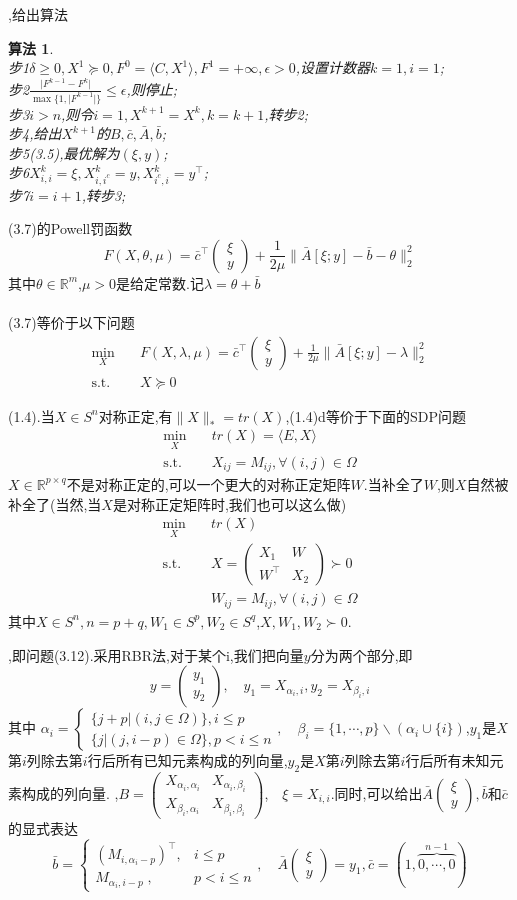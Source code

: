\documentclass[UTF8]{ctexart}
\newtheorem{algo}{算法}
\newcommand{\s}{\quad}
\newcommand{\p}{\paragraph{}\s}
\newcommand{\equSplit}[1]{\begin{equation}\begin{split}#1\end{split}\end{equation}}
\newcommand{\equ}[1]{\begin{equation}#1\end{equation}}
\newcommand{\Tst}{\text{s.t.}\s}
\newcommand{\abs}[1]{\lvert#1\rvert}
\newcommand{\norm}[1]{\lVert#1\rVert}
\newcommand{\inprod}[1]{\langle#1\rangle}
\newcommand{\Real}[1]{\mathbb{R}^{#1}}
\newcommand{\nunorm}{\norm{X}_*}
\newcommand{\pMa}[1]{\begin{pmatrix}#1\end{pmatrix}}
\numberwithin{equation}{section}
\begin{document}
,给出算法
\begin{algo}
	\s\\
	步1$\delta\geq0,X^1\succeq0,F^0=\inprod{C,X^1},F^1=+\infty,\epsilon>0$,设置计数器$k=1,i=1$;\\
	步2$\frac{\abs{F^{k-1}-F^k}}{\max\{1,\abs{F^{k-1}}\}}\leq\epsilon$,则停止;\\
	步3$i>n$,则令$i=1,X^{k+1}=X^k,k=k+1$,转步2;\\
	步4,给出$X^{k+1}$的$B,\bar{c},\bar{A},\bar{b}$;\\
	步5(3.5),最优解为$(\xi,y)$;\\
	步6$X^{k}_{i,i}=\xi,X^{k}_{i,i^c}=y,X^{k}_{i^c,i}=y^\top$;\\
	步7\s$i=i+1$,转步3;
\end{algo}

(3.7)的Powell罚函数
\equ{
	F(X,\theta,\mu)=\bar{c}^\top\pMa{\xi\\y}+\frac{1}{2\mu}\norm{\bar{A}[\xi;y]-\bar{b}-\theta}^2_2
}
其中$\theta\in\Real{m}$,$\mu>0$是给定常数.记$\lambda=\theta+\bar{b}$

\p(3.7)等价于以下问题
\equSplit{
	\min_{X}\s&F(X,\lambda,\mu)=\bar{c}^\top\pMa{\xi\\y}+\frac{1}{2\mu}\norm{\bar{A}[\xi;y]-\lambda}^2_2\\
	\Tst&X\succeq0
}

(1.4).当$X\in S^n$对称正定,有$\nunorm=tr(X)$,(1.4)d等价于下面的SDP问题
\equSplit{
	\min_X\s&tr(X)=\inprod{E,X}\\
	\Tst&X_{ij}=M_{ij},\forall(i,j)\in\Omega
}
$X\in\Real{p\times q}$不是对称正定的,可以一个更大的对称正定矩阵$W$.当补全了$W$,则$X$自然被补全了(当然,当$X$是对称正定矩阵时,我们也可以这么做)
\equSplit{
	\min_X\s&tr(X)\\
	\Tst&X=\pMa{X_1&W\\W^\top&X_2}\succ0\\
	&W_{ij}=M_{ij},\forall(i,j)\in\Omega
}
其中$X\in S^{n},n=p+q,W_1\in S^p,W_2\in S^q$,$X,W_1,W_2\succ0$.

,即问题(3.12).采用RBR法,对于某个i,我们把向量$y$分为两个部分,即
\equ{y=\pMa{y_1\\y_2},\s y_1=X_{\alpha_i,i},y_2=X_{\beta_i,i}}
其中
$\alpha_i=
\begin{cases}
	\{j+p\vert(i,j\in\Omega)\},i\leq p   \\
	\{j\vert(j,i-p)\in\Omega\},p<i\leq n
\end{cases}
,\s
\beta_i=\{1,\cdots,p\}\backslash(\alpha_i\cup\{i\})$,$y_1$是$X$第$i$列除去第$i$行后所有已知元素构成的列向量,$y_2$是$X$第$i$列除去第$i$行后所有未知元素构成的列向量.
,$B=\pMa{X_{\alpha_i,\alpha_i}&X_{\alpha_i,\beta_i}\\X_{\beta_i,\alpha_i}&X_{\beta_i,\beta_i}}$,$\s\xi=X_{i,i}$.同时,可以给出$\bar{A}\pMa{\xi\\y},\bar{b}$和$\bar{c}$的显式表达
\equ{
	\bar{b}=\begin{cases}
	(M_{i,\alpha_i-p})^\top,&i\leq p\\
	M_{\alpha_i,i-p}\;,&p<i\leq n
	\end{cases},\s
	\bar{A}\pMa{\xi\\y}=y_1,
	\bar{c}=(1,\overbrace{0,\cdots,0}^{n-1})
}
\end{document}
